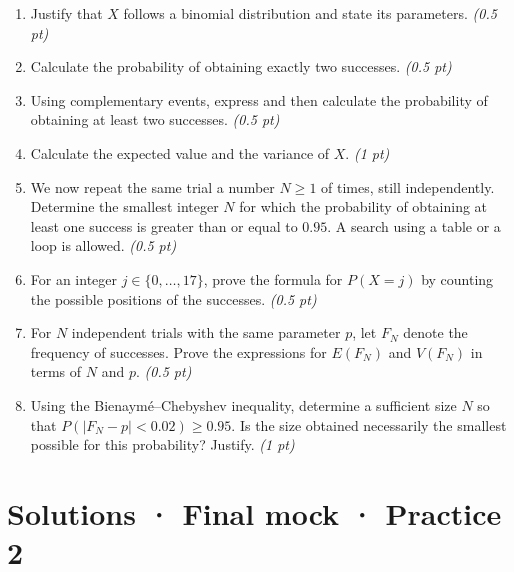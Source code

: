 \begin{enumerate}

\item Justify that $X$ follows a binomial distribution and state its parameters. \hfill\textit{(0.5 pt)}

\item Calculate the probability of obtaining exactly two successes. \hfill\textit{(0.5 pt)}

\item Using complementary events, express and then calculate the probability of obtaining at least two successes. \hfill\textit{(0.5 pt)}

\item Calculate the expected value and the variance of $X$. \hfill\textit{(1 pt)}

\item We now repeat the same trial a number $N\ge1$ of times, still independently. Determine the smallest integer $N$ for which the probability of obtaining at least one success is greater than or equal to $0.95$. A search using a table or a loop is allowed. \hfill\textit{(0.5 pt)}

\item For an integer $j\in\{0,\ldots,17\}$, prove the formula for $P(X=j)$ by counting the possible positions of the successes. \hfill\textit{(0.5 pt)}

\item For $N$ independent trials with the same parameter $p$, let $F_N$ denote the frequency of successes. Prove the expressions for $E(F_N)$ and $V(F_N)$ in terms of $N$ and $p$. \hfill\textit{(0.5 pt)}

\item Using the Bienaymé–Chebyshev inequality, determine a sufficient size $N$ so that $P(|F_N-p|<0.02)\ge0.95$. Is the size obtained necessarily the smallest possible for this probability? Justify. \hfill\textit{(1 pt)}

\end{enumerate}

\ifprof\clearpage

\section*{Solutions · Final mock · Practice 2}\label{cor:9-2}

